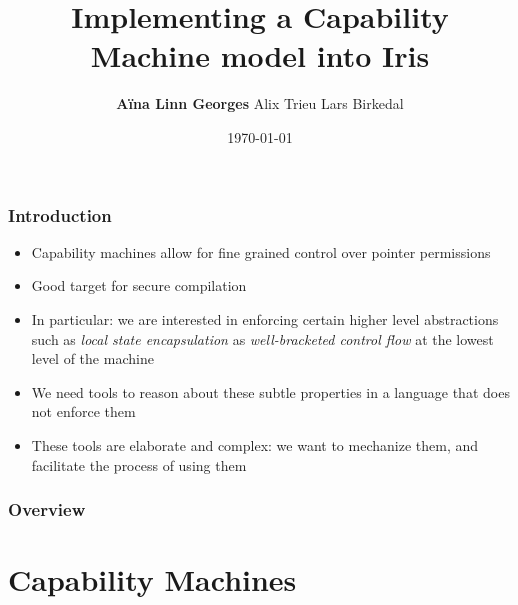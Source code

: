 \documentclass{beamer}
\title[Capability Machine in Iris]{Implementing a Capability Machine model into Iris} %
\author{\textbf{A\"{i}na Linn Georges} \hspace{1cm} Alix Trieu \hspace{1cm} Lars Birkedal} %
\institute[Aarhus University] %
{
Aarhus University \\ %
\medskip
\textit{ageorges@cs.au.dk} %
}
\date{\today} %
\begin{document}
\begin{frame}
\titlepage %
\end{frame}

\begin{frame}
\frametitle{Introduction}

\begin{itemize}
	\item<1> Capability machines allow for fine grained control over pointer permissions 
	\item<2> Good target for secure compilation
	\item<3> In particular: we are interested in enforcing certain higher level abstractions such as \textit{local state encapsulation} as \textit{well-bracketed control flow} at the lowest level of the machine
	\item<4> We need tools to reason about these subtle properties in a language that does not enforce them
	\item<5> These tools are elaborate and complex: we want to mechanize them, and facilitate the process of using them
\end{itemize}

\end{frame}


\begin{frame}
\frametitle{Overview} %
\tableofcontents[hideallsubsections]
\end{frame}

\section{Capability Machines} %
\end{document}
